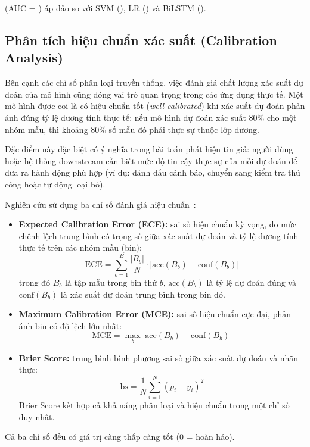 \phobert (AUC = \phobertaUC) áp đảo so với SVM (\svmaUC), LR (\lraUC) và BiLSTM (\bilstmaUC).

\subsection{Phân tích hiệu chuẩn xác suất (Calibration Analysis)}
\label{sec:calibration}

Bên cạnh các chỉ số phân loại truyền thống, việc đánh giá chất lượng xác suất dự đoán của mô hình cũng đóng vai trò quan trọng trong các ứng dụng thực tế. Một mô hình được coi là có hiệu chuẩn tốt (\textit{well-calibrated}) khi xác suất dự đoán phản ánh đúng tỷ lệ dương tính thực tế: nếu mô hình dự đoán xác suất 80\% cho một nhóm mẫu, thì khoảng 80\% số mẫu đó phải thực sự thuộc lớp dương.

Đặc điểm này đặc biệt có ý nghĩa trong bài toán phát hiện tin giả: người dùng hoặc hệ thống downstream cần biết mức độ tin cậy thực sự của mỗi dự đoán để đưa ra hành động phù hợp (ví dụ: đánh dấu cảnh báo, chuyển sang kiểm tra thủ công hoặc tự động loại bỏ).

Nghiên cứu sử dụng ba chỉ số đánh giá hiệu chuẩn~\cite{naeini2015ece}:

\begin{itemize}[leftmargin=2em]
  \item \textbf{Expected Calibration Error (ECE):} sai số hiệu chuẩn kỳ vọng, đo mức chênh lệch trung bình có trọng số giữa xác suất dự đoán và tỷ lệ dương tính thực tế trên các nhóm mẫu (bin):
  \[
    \text{ECE} = \sum_{b=1}^{B} \frac{|B_b|}{N} \cdot |\text{acc}(B_b) - \text{conf}(B_b)|
  \]
  trong đó $B_b$ là tập mẫu trong bin thứ $b$, $\text{acc}(B_b)$ là tỷ lệ dự đoán đúng và $\text{conf}(B_b)$ là xác suất dự đoán trung bình trong bin đó.

  \item \textbf{Maximum Calibration Error (MCE):} sai số hiệu chuẩn cực đại, phản ánh bin có độ lệch lớn nhất:
  \[
    \text{MCE} = \max_{b} |\text{acc}(B_b) - \text{conf}(B_b)|
  \]

  \item \textbf{Brier Score:} trung bình bình phương sai số giữa xác suất dự đoán và nhãn thực:
  \[
    \text{bs} = \frac{1}{N} \sum_{i=1}^{N} (p_i - y_i)^2
  \]
  Brier Score kết hợp cả khả năng phân loại và hiệu chuẩn trong một chỉ số duy nhất.
\end{itemize}

Cả ba chỉ số đều có giá trị càng thấp càng tốt (0 = hoàn hảo).


